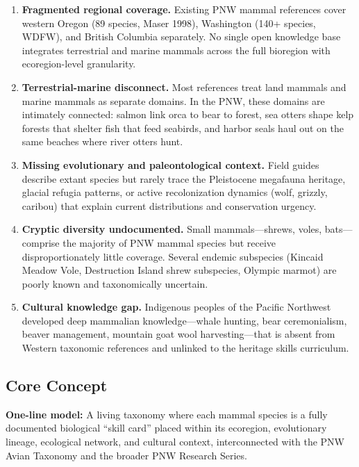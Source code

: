\documentclass[11pt,letterpaper]{article}
\begin{document}
\begin{enumerate}[leftmargin=2em]
\item \textbf{Fragmented regional coverage.} Existing PNW mammal references cover western Oregon (89 species, Maser 1998), Washington (140+ species, WDFW), and British Columbia separately. No single open knowledge base integrates terrestrial and marine mammals across the full bioregion with ecoregion-level granularity.

\item \textbf{Terrestrial-marine disconnect.} Most references treat land mammals and marine mammals as separate domains. In the PNW, these domains are intimately connected: salmon link orca to bear to forest, sea otters shape kelp forests that shelter fish that feed seabirds, and harbor seals haul out on the same beaches where river otters hunt.

\item \textbf{Missing evolutionary and paleontological context.} Field guides describe extant species but rarely trace the Pleistocene megafauna heritage, glacial refugia patterns, or active recolonization dynamics (wolf, grizzly, caribou) that explain current distributions and conservation urgency.

\item \textbf{Cryptic diversity undocumented.} Small mammals---shrews, voles, bats---comprise the majority of PNW mammal species but receive disproportionately little coverage. Several endemic subspecies (Kincaid Meadow Vole, Destruction Island shrew subspecies, Olympic marmot) are poorly known and taxonomically uncertain.

\item \textbf{Cultural knowledge gap.} Indigenous peoples of the Pacific Northwest developed deep mammalian knowledge---whale hunting, bear ceremonialism, beaver management, mountain goat wool harvesting---that is absent from Western taxonomic references and unlinked to the heritage skills curriculum.
\end{enumerate}

\subsection{Core Concept}

\textbf{One-line model:} A living taxonomy where each mammal species is a fully documented biological ``skill card'' placed within its ecoregion, evolutionary lineage, ecological network, and cultural context, interconnected with the PNW Avian Taxonomy and the broader PNW Research Series.
\end{document}
